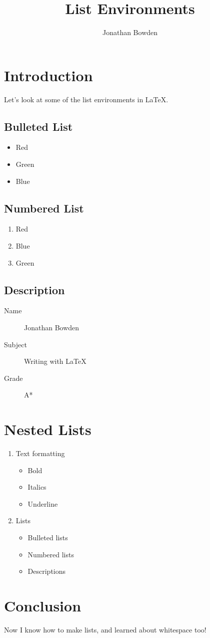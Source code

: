 \documentclass{article}
\title{List Environments}
\author{Jonathan Bowden}
\begin{document}
\maketitle

\section{Introduction}

Let's look at some of the list environments in \LaTeX.

\subsection{Bulleted List}

\begin{itemize}
\item Red
\item Green
\item Blue
\end{itemize}

\subsection{Numbered List}

\begin{enumerate}
\item Red
\item Blue
\item Green
\end{enumerate}

\subsection{Description}

\begin{description}
	\item[Name] Jonathan Bowden
	\item[Subject] Writing with \LaTeX
	\item[Grade] A*
\end{description}

\section{Nested Lists}

\begin{enumerate}
\item Text formatting
	\begin{itemize}
	\item Bold
	\item Italics
	\item Underline
	\end{itemize}
\item Lists
	\begin{itemize}
	\item Bulleted lists
	\item Numbered lists
	\item Descriptions
	\end{itemize}
\end{enumerate}

\section{Conclusion}

Now I know how to make lists, and learned about whitespace too!
\end{document}
